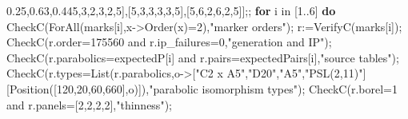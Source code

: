\documentclass[
  10pt,
  letterpaper,
]{article}
\newenvironment{Shaded}{}{}
\newcommand{\BuiltInTok}[1]{\textcolor[rgb]{0.00,0.50,0.00}{#1}}
\newcommand{\ConstantTok}[1]{\textcolor[rgb]{0.53,0.00,0.00}{#1}}
\newcommand{\ControlFlowTok}[1]{\textcolor[rgb]{0.00,0.44,0.13}{\textbf{#1}}}
\newcommand{\ExtensionTok}[1]{#1}
\newcommand{\FloatTok}[1]{\textcolor[rgb]{0.25,0.63,0.44}{#1}}
\newcommand{\NormalTok}[1]{#1}
\newcommand{\OperatorTok}[1]{\textcolor[rgb]{0.40,0.40,0.40}{#1}}
\newcommand{\StringTok}[1]{\textcolor[rgb]{0.25,0.44,0.63}{#1}}
\newcommand{\VariableTok}[1]{\textcolor[rgb]{0.10,0.09,0.49}{#1}}
\begin{document}
\begin{Shaded}
\begin{Highlighting}[]
\NormalTok{ [}\FloatTok{5}\OperatorTok{,}\FloatTok{3}\OperatorTok{,}\FloatTok{2}\OperatorTok{,}\FloatTok{3}\OperatorTok{,}\FloatTok{2}\OperatorTok{,}\FloatTok{5}\NormalTok{]}\OperatorTok{,}\NormalTok{[}\FloatTok{5}\OperatorTok{,}\FloatTok{3}\OperatorTok{,}\FloatTok{3}\OperatorTok{,}\FloatTok{3}\OperatorTok{,}\FloatTok{3}\OperatorTok{,}\FloatTok{5}\NormalTok{]}\OperatorTok{,}\NormalTok{[}\FloatTok{5}\OperatorTok{,}\FloatTok{6}\OperatorTok{,}\FloatTok{2}\OperatorTok{,}\FloatTok{6}\OperatorTok{,}\FloatTok{2}\OperatorTok{,}\FloatTok{5}\NormalTok{]]}\OperatorTok{;;}
\ControlFlowTok{for} \VariableTok{i} \ExtensionTok{in}\NormalTok{ [}\FloatTok{1}\OperatorTok{..}\FloatTok{6}\NormalTok{] }\ControlFlowTok{do}
 \VariableTok{CheckC}\NormalTok{(}\BuiltInTok{ForAll}\NormalTok{(}\VariableTok{marks}\NormalTok{[}\VariableTok{i}\NormalTok{]}\OperatorTok{,}\VariableTok{x}\OperatorTok{{-}\textgreater{}}\BuiltInTok{Order}\NormalTok{(}\VariableTok{x}\NormalTok{)}\OperatorTok{=}\FloatTok{2}\NormalTok{)}\OperatorTok{,}\StringTok{"marker orders"}\NormalTok{)}\OperatorTok{;}
 \VariableTok{r}\OperatorTok{:=}\VariableTok{VerifyC}\NormalTok{(}\VariableTok{marks}\NormalTok{[}\VariableTok{i}\NormalTok{])}\OperatorTok{;}
 \VariableTok{CheckC}\NormalTok{(}\VariableTok{r}\NormalTok{.}\VariableTok{order}\OperatorTok{=}\FloatTok{175560} \ConstantTok{and} \VariableTok{r}\NormalTok{.}\VariableTok{ip\_failures}\OperatorTok{=}\FloatTok{0}\OperatorTok{,}\StringTok{"generation and IP"}\NormalTok{)}\OperatorTok{;}
 \VariableTok{CheckC}\NormalTok{(}\VariableTok{r}\NormalTok{.}\VariableTok{parabolics}\OperatorTok{=}\VariableTok{expectedP}\NormalTok{[}\VariableTok{i}\NormalTok{] }\ConstantTok{and} \VariableTok{r}\NormalTok{.}\VariableTok{pairs}\OperatorTok{=}\VariableTok{expectedPairs}\NormalTok{[}\VariableTok{i}\NormalTok{]}\OperatorTok{,}\StringTok{"source tables"}\NormalTok{)}\OperatorTok{;}
 \VariableTok{CheckC}\NormalTok{(}\VariableTok{r}\NormalTok{.}\VariableTok{types}\OperatorTok{=}\BuiltInTok{List}\NormalTok{(}\VariableTok{r}\NormalTok{.}\VariableTok{parabolics}\OperatorTok{,}\VariableTok{o}\OperatorTok{{-}\textgreater{}}\NormalTok{[}\StringTok{"C2 x A5"}\OperatorTok{,}\StringTok{"D20"}\OperatorTok{,}\StringTok{"A5"}\OperatorTok{,}\StringTok{"PSL(2,11)"}\NormalTok{]}
\NormalTok{  [}\BuiltInTok{Position}\NormalTok{([}\FloatTok{120}\OperatorTok{,}\FloatTok{20}\OperatorTok{,}\FloatTok{60}\OperatorTok{,}\FloatTok{660}\NormalTok{]}\OperatorTok{,}\VariableTok{o}\NormalTok{)])}\OperatorTok{,}\StringTok{"parabolic isomorphism types"}\NormalTok{)}\OperatorTok{;}
 \VariableTok{CheckC}\NormalTok{(}\VariableTok{r}\NormalTok{.}\VariableTok{borel}\OperatorTok{=}\FloatTok{1} \ConstantTok{and} \VariableTok{r}\NormalTok{.}\VariableTok{panels}\OperatorTok{=}\NormalTok{[}\FloatTok{2}\OperatorTok{,}\FloatTok{2}\OperatorTok{,}\FloatTok{2}\OperatorTok{,}\FloatTok{2}\NormalTok{]}\OperatorTok{,}\StringTok{"thinness"}\NormalTok{)}\OperatorTok{;}

\end{Highlighting}
\end{Shaded}
\end{document}
